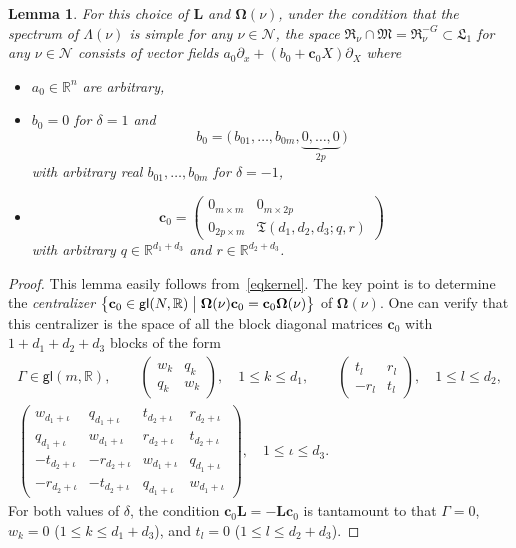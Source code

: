 \documentclass[12pt,reqno]{amsart}
\newtheorem{lem}{Lemma} \newtheorem{thm}{Theorem}
\theoremstyle{definition}
\begin{document}
\begin{lem}\label{lemfR}
For this choice of ${\mathbf L}$ and ${\mathbf{\Omega}}(\nu)$, under the condition that the
spectrum of $\Lambda(\nu)$ is simple for any $\nu\in{\mathcal N}$, the space
${\mathfrak R}_\nu\cap{\mathfrak M}={\mathfrak R}_\nu^{-G}\subset{\mathfrak L}_1$ for any $\nu\in{\mathcal N}$ consists of
vector fields $a_0\partial_x+(b_0+{\mathbf c}_0X)\partial_X$ where
\begin{itemize}
\item $a_0\in{\mathbb R}^n$ are arbitrary,
\item $b_0=0$ for $\delta=1$ and
\[
b_0=\bigl(\, b_{01},\ldots,b_{0m},\underbrace{0,\ldots,0}_{2p} \,\bigr)
\]
with arbitrary real $b_{01},\ldots,b_{0m}$ for $\delta=-1$,
\item
\[
{\mathbf c}_0=\begin{pmatrix}
0_{m\times m} & 0_{m\times 2p} \\
0_{2p\times m} & {\mathfrak T}(d_1,d_2,d_3;q,r)
\end{pmatrix}
\]
with arbitrary $q\in{\mathbb R}^{d_1+d_3}$ and $r\in{\mathbb R}^{d_2+d_3}$.
\end{itemize}
\end{lem}

\begin{proof}
This lemma easily follows from~\eqref{eqkernel}. The key point is to determine
the \emph{centralizer}
$\bigl\{{\mathbf c}_0\in{\mathsf{gl}}(N,{\mathbb R}) \bigm| {\mathbf{\Omega}}(\nu){\mathbf c}_0={\mathbf c}_0{\mathbf{\Omega}}(\nu)\bigr\}$
of ${\mathbf{\Omega}}(\nu)$. One can verify that this centralizer is the space of all
the block diagonal matrices ${\mathbf c}_0$ with $1+d_1+d_2+d_3$ blocks of the form
\begin{gather*}
\Gamma\in{\mathsf{gl}}(m,{\mathbb R}), \qquad
\begin{pmatrix} w_k & q_k \\ q_k & w_k \end{pmatrix}, \quad
1{\leqslant} k{\leqslant} d_1, \qquad
\begin{pmatrix} t_l & r_l \\ -r_l & t_l \end{pmatrix}, \quad
1{\leqslant} l{\leqslant} d_2, \\
\begin{pmatrix}
w_{d_1+\iota} & q_{d_1+\iota} & t_{d_2+\iota} & r_{d_2+\iota} \\
q_{d_1+\iota} & w_{d_1+\iota} & r_{d_2+\iota} & t_{d_2+\iota} \\
-t_{d_2+\iota} & -r_{d_2+\iota} & w_{d_1+\iota} & q_{d_1+\iota} \\
-r_{d_2+\iota} & -t_{d_2+\iota} & q_{d_1+\iota} & w_{d_1+\iota}
\end{pmatrix}, \quad 1{\leqslant}\iota{\leqslant} d_3.
\end{gather*}
For both values of $\delta$, the condition ${\mathbf c}_0{\mathbf L}=-{\mathbf L}{\mathbf c}_0$ is tantamount
to that $\Gamma=0$, $w_k=0$ ($1{\leqslant} k{\leqslant} d_1+d_3$), and $t_l=0$
($1{\leqslant} l{\leqslant} d_2+d_3$).
\end{proof}
\end{document}
